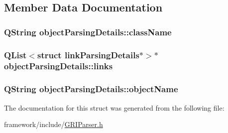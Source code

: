 \subsection{\-Member \-Data \-Documentation}
\hypertarget{structobjectParsingDetails_a41b32c25562ba5deaca6c9d5f3f3b7c9}{
\subsubsection[{class\-Name}]{\setlength{\rightskip}{0pt plus 5cm}\-Q\-String {\bf object\-Parsing\-Details\-::class\-Name}}}\label{structobjectParsingDetails_a41b32c25562ba5deaca6c9d5f3f3b7c9}
\hypertarget{structobjectParsingDetails_ab05542f10e1957514ed831b03efb4ef5}{
\subsubsection[{links}]{\setlength{\rightskip}{0pt plus 5cm}\-Q\-List$<$struct {\bf link\-Parsing\-Details}$\ast$$>$$\ast$ {\bf object\-Parsing\-Details\-::links}}}\label{structobjectParsingDetails_ab05542f10e1957514ed831b03efb4ef5}
\hypertarget{structobjectParsingDetails_aa6dcb31a8662af48c35bc5ef7da04e93}{
\subsubsection[{object\-Name}]{\setlength{\rightskip}{0pt plus 5cm}\-Q\-String {\bf object\-Parsing\-Details\-::object\-Name}}}\label{structobjectParsingDetails_aa6dcb31a8662af48c35bc5ef7da04e93}


\-The documentation for this struct was generated from the following file\-:\begin{DoxyCompactItemize}
\item 
framework/include/\hyperlink{GRIParser_8h}{\-G\-R\-I\-Parser.\-h}\end{DoxyCompactItemize}

